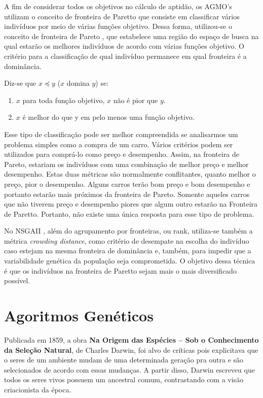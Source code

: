 \documentclass[]{article}
\begin{document}
	A fim de considerar todos os objetivos no cálculo de aptidão, os AGMO's utilizam o conceito de fronteira de Paretto \cite{Pareto} que consiste em classificar vários indivíduos por meio de várias funções objetivo. Dessa forma, utilizou-se o conceito de fronteira de Pareto  \cite{Pareto}, que estabelece uma região do espaço de busca na qual estarão os melhores indivíduos de acordo com várias funções objetivo. O critério para a classificação de qual indivíduo permanece em qual fronteira é a dominância.
	
	Diz-se que $x \preceq y$ ($x$ domina $y$) se:
	
	\begin{enumerate}
		\item $x$ para toda função objetivo, $x$ não é pior que $y$.
		
		\item $x$ é melhor do que y em pelo menos uma função objetivo.
	\end{enumerate}
	
	Esse tipo de classificação pode ser melhor compreendida se analisarmos um problema simples como a compra de um carro. Vários critérios podem ser utilizados para comprá-lo como preço e desempenho. Assim, na fronteira de Pareto, estariam os indivíduos com uma combinação de melhor preço e melhor desempenho. Estas duas métricas são normalmente conflitantes, quanto melhor o preço, pior o desempenho. Alguns carros terão bom preço e bom desempenho e portanto estarão mais próximos da fronteira de Pareto. Somente aqueles carros que não tiverem preço e desempenho piores que algum outro estarão na Fronteira de Paretto. Portanto, não existe uma única resposta para esse tipo de problema.
	
	No  NSGAII \cite{NSGAII}, além do agrupamento por fronteiras, ou rank, utiliza-se também a métrica \textit{crowding distance}, como critério de desempate na escolha do indivíduo caso estejam na mesma fronteira de dominância e, também, para impedir que a variabilidade genética da população seja comprometida. O objetivo dessa técnica é que os indivíduos na fronteira de Paretto sejam mais o mais diversificado possível.
	 
	
\section{Agoritmos Genéticos}

	Publicada em 1859, a obra \textbf{Na Origem das Espécies – Sob o Conhecimento da Seleção Natural}, de Charles Darwin, foi alvo de críticas pois explicitava que o seres de um ambiente mudam de uma determinada geração pra outra e são selecionados de acordo com essas mudanças. A partir disso, Darwin escreveu que todos os seres vivos possuem um ancestral comum, contrastando com a visão criacionista da época.
	
\end{document}
